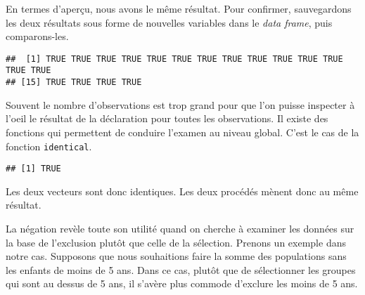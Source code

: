 \documentclass[]{book}
\newenvironment{Shaded}{\begin{snugshade}}{\end{snugshade}}
\newcommand{\KeywordTok}[1]{\textcolor[rgb]{0.13,0.29,0.53}{\textbf{#1}}}
\newcommand{\DecValTok}[1]{\textcolor[rgb]{0.00,0.00,0.81}{#1}}
\newcommand{\StringTok}[1]{\textcolor[rgb]{0.31,0.60,0.02}{#1}}
\newcommand{\OperatorTok}[1]{\textcolor[rgb]{0.81,0.36,0.00}{\textbf{#1}}}
\newcommand{\NormalTok}[1]{#1}
\begin{document}
En termes d'aperçu, nous avons le même résultat. Pour confirmer,
sauvegardons les deux résultats sous forme de nouvelles variables dans
le \emph{data frame}, puis comparons-les.

\begin{Shaded}
\end{Shaded}

\begin{verbatim}
##  [1] TRUE TRUE TRUE TRUE TRUE TRUE TRUE TRUE TRUE TRUE TRUE TRUE TRUE TRUE
## [15] TRUE TRUE TRUE TRUE
\end{verbatim}

Souvent le nombre d'observations est trop grand pour que l'on puisse
inspecter à l'oeil le résultat de la déclaration pour toutes les
observations. Il existe des fonctions qui permettent de conduire
l'examen au niveau global. C'est le cas de la fonction
\texttt{identical}.

\begin{Shaded}
\end{Shaded}

\begin{verbatim}
## [1] TRUE
\end{verbatim}

Les deux vecteurs sont donc identiques. Les deux procédés mènent donc au
même résultat.

La négation revèle toute son utilité quand on cherche à examiner les
données sur la base de l'exclusion plutôt que celle de la sélection.
Prenons un exemple dans notre cas. Supposons que nous souhaitions faire
la somme des populations sans les enfants de moins de 5 ans. Dans ce
cas, plutôt que de sélectionner les groupes qui sont au dessus de 5 ans,
il s'avère plus commode d'exclure les moins de 5 ans.
\end{document}
